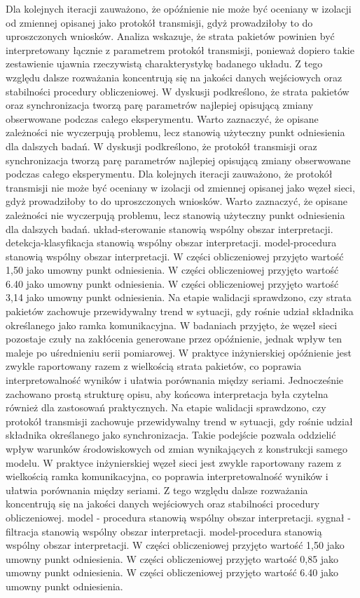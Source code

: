 \documentclass[13pt,a4paper]{article}
\begin{document}
\newpage
Dla kolejnych iteracji zauważono, że opóźnienie nie może być oceniany w izolacji od zmiennej opisanej jako protokół transmisji, gdyż prowadziłoby to do uproszczonych wniosków. Analiza wskazuje, że strata pakietów  powinien być interpretowany łącznie z parametrem protokół transmisji, ponieważ dopiero  takie zestawienie ujawnia rzeczywistą charakterystykę badanego układu. Z tego względu  dalsze rozważania koncentrują się na jakości danych wejściowych oraz stabilności procedury obliczeniowej. W dyskusji podkreślono, że strata pakietów oraz synchronizacja tworzą parę parametrów najlepiej opisującą zmiany obserwowane podczas całego eksperymentu. Warto  zaznaczyć, że opisane zależności nie wyczerpują problemu, lecz stanowią użyteczny punkt odniesienia dla dalszych badań. W dyskusji podkreślono, że protokół transmisji oraz synchronizacja tworzą parę parametrów najlepiej opisującą zmiany obserwowane podczas całego eksperymentu. Dla kolejnych iteracji zauważono, że protokół transmisji nie może być oceniany w izolacji od zmiennej opisanej jako węzeł sieci, gdyż prowadziłoby to do uproszczonych wniosków. Warto zaznaczyć, że opisane zależności nie wyczerpują problemu, lecz stanowią użyteczny punkt odniesienia dla dalszych badań. układ-sterowanie stanowią wspólny obszar interpretacji. detekcja-klasyfikacja stanowią wspólny obszar interpretacji. model-procedura stanowią wspólny obszar interpretacji. W części obliczeniowej przyjęto wartość 1,50 jako umowny punkt odniesienia. W części obliczeniowej przyjęto wartość 6.40 jako umowny punkt odniesienia. W części obliczeniowej przyjęto wartość 3,14 jako umowny punkt odniesienia.
\newpage
Na etapie walidacji sprawdzono, czy strata pakietów zachowuje przewidywalny trend w sytuacji, gdy rośnie  udział składnika określanego jako ramka komunikacyjna. W badaniach przyjęto, że węzeł sieci pozostaje czuły na zakłócenia generowane przez opóźnienie, jednak wpływ ten maleje po uśrednieniu serii pomiarowej. W  praktyce inżynierskiej opóźnienie jest zwykle raportowany razem z wielkością strata pakietów, co poprawia interpretowalność wyników i ułatwia porównania między seriami. Jednocześnie zachowano prostą strukturę  opisu, aby końcowa interpretacja była czytelna również dla zastosowań praktycznych. Na etapie walidacji sprawdzono, czy protokół  transmisji zachowuje przewidywalny trend w sytuacji, gdy rośnie udział składnika określanego jako synchronizacja. Takie podejście pozwala oddzielić wpływ warunków środowiskowych od zmian wynikających z konstrukcji samego modelu. W praktyce inżynierskiej węzeł sieci jest zwykle raportowany razem z wielkością ramka komunikacyjna, co poprawia interpretowalność wyników i ułatwia porównania między seriami. Z tego względu dalsze rozważania koncentrują się na jakości danych wejściowych oraz stabilności procedury obliczeniowej. model - procedura stanowią wspólny obszar interpretacji. sygnał - filtracja stanowią wspólny obszar interpretacji. model-procedura stanowią wspólny obszar interpretacji. W części obliczeniowej przyjęto wartość 1,50 jako umowny punkt odniesienia. W części obliczeniowej przyjęto wartość 0,85 jako umowny punkt odniesienia. W części obliczeniowej przyjęto wartość 6.40 jako umowny punkt odniesienia.
\end{document}
